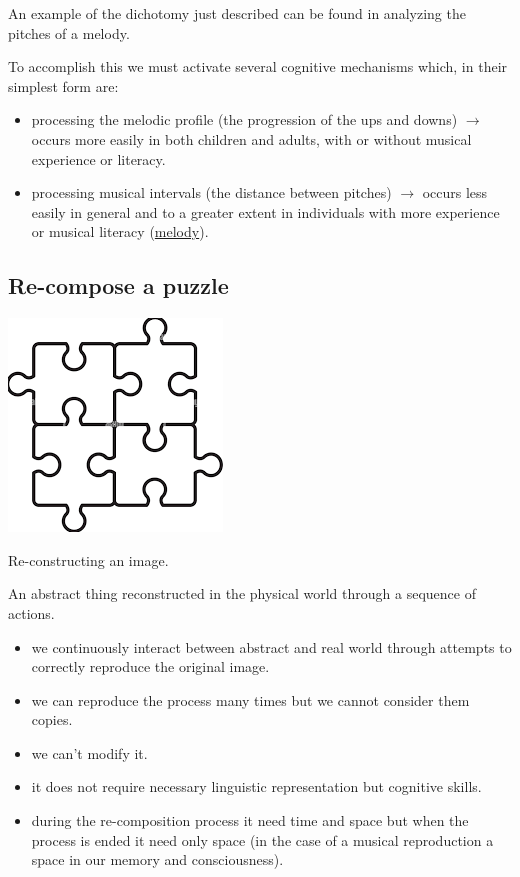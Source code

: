 An example of the dichotomy just described can be found in analyzing the pitches of a melody.

To accomplish this we must activate several cognitive mechanisms which, in their simplest form are:

\begin{itemize}
\tightlist
\item processing the melodic profile (the progression of the ups and downs)  \(\rightarrow\) occurs more easily in both children and adults, with or without musical experience or literacy.
\item processing musical intervals (the distance between pitches) \(\rightarrow\) occurs less easily in general and to a greater extent in individuals with more experience or musical literacy (\href{http://www.musicaecodice.it/gitmedia/emc/1_media/veloso.mp3}{melody}).
\end{itemize}

\subsection{Re-compose a puzzle}\label{re-compose-a-puzzle}

\begin{center}
\includegraphics[scale=0.3]{../img/puzzle.png}
\end{center}

Re-constructing an image.

An abstract thing reconstructed in the physical world through a sequence of actions.

\begin{itemize}
\tightlist
\item we continuously interact between abstract and real world through attempts to correctly reproduce the original image.
\item we can reproduce the process many times but we cannot consider them copies.
\item we can't modify it.
\item it does not require necessary linguistic representation but cognitive skills.
\item during the re-composition process it need time and space but when the process is ended it need only space (in the case of a musical reproduction a space in our memory and consciousness).
\end{itemize}

